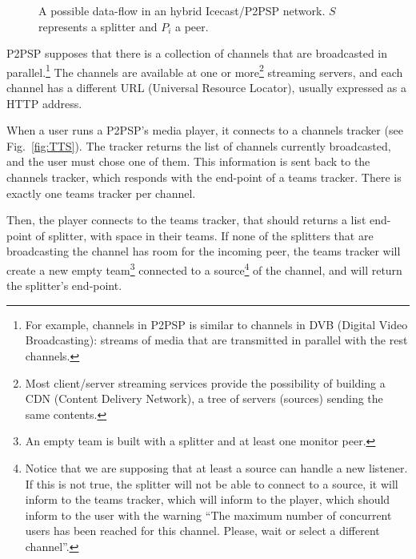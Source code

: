\label{sec:TTS}

\begin{figure}
   \caption{A possible data-flow in an
  hybrid Icecast/P2PSP network. $S$ represents a splitter and $P_i$ a
  peer.\label{fig:icecast-P2PSP}}
\end{figure}

P2PSP supposes that there is a collection of channels that are
broadcasted in parallel.\footnote{For example, channels in P2PSP is
  similar to channels in DVB (Digital Video Broadcasting): streams of
  media that are transmitted in parallel with the rest channels.} The
channels are available at one or more\footnote{Most client/server
  streaming services provide the possibility of building a CDN
  (Content Delivery Network), a tree of servers (sources) sending the
  same contents.} streaming servers, and each channel has a different
URL (Universal Resource Locator), usually expressed as a HTTP address.

\begin{figure*}
   \caption{Procedures to determine a suitable team
    given a channel.\label{fig:TTS}}
\end{figure*}

When a user runs a P2PSP's media player, it connects to a channels
tracker (see Fig.~\ref{fig:TTS}). The tracker returns the list of
channels currently broadcasted, and the user must chose one of
them. This information is sent back to the channels tracker, which
responds with the end-point of a teams tracker. There is exactly one
teams tracker per channel.

Then, the player connects to the teams tracker, that should returns a
list end-point of splitter, with space in their teams. If none of the
splitters that are broadcasting the channel has room for the incoming
peer, the teams tracker will create a new empty team\footnote{An empty
  team is built with a splitter and at least one monitor peer.}
connected to a source\footnote{Notice that we are supposing that at
  least a source can handle a new listener. If this is not true, the
  splitter will not be able to connect to a source, it will inform to
  the teams tracker, which will inform to the player, which should
  inform to the user with the warning ``The maximum number of
  concurrent users has been reached for this channel. Please, wait or
  select a different channel''.} of the channel, and will return the
splitter's end-point.

